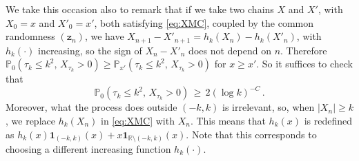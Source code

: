 \documentclass[reqno,11pt]{amsart}
\numberwithin{equation}{section}
\newcommand{\ind}{\mathbf{1}}
\newcommand{\bbP}{{\ensuremath{\mathbb P}} }
\newcommand{\bbR}{{\ensuremath{\mathbb R}} }
\newcommand{\logZ}{\mathtt{z}}
\begin{document}
We take this occasion also to remark that if we take two chains $X$ and $X'$, with $X_0=x$ and  $X'_0=x'$, both satisfying \eqref{eq:XMC}, coupled by the common randomness $( \logZ_n)$, we have
$X_{n+1}-X'_{n+1}= h_k(X_n)- h_k(X'_n)$, with $h_k(\cdot) $ increasing,  so the sign of $X_{n}-X'_{n}$ does not depend on $n$. 
Therefore 
$\bbP_0\left( \tau_k \le k^2, \, 
X_{\tau_k} >0\right)\ge \bbP_{x'}\left( \tau_k \le k^2, \, 
X_{\tau_k} >0\right)$  for $x \ge x'$. So it suffices  to check that 
\begin{equation} 
\label{eq:tbv}
\bbP_0\left( \tau_k \le k^2, \, 
X_{\tau_k} >0\right)\, \ge \,  2( \log k) ^{-C}\,.
\end{equation}
Moreover, what the process does outside $(-k, k)$ is irrelevant, so, when $\vert X_n\vert \ge k$, we replace $h_k(X_n)$ in 
\eqref{eq:XMC}  with $X_n$. This means that $h_k(x)$ is redefined as $h_k(x) \ind_{(-k,k)}(x)+ x\ind_{\bbR \setminus(-k,k)}(x)$.
Note that this corresponds to choosing a different increasing function $h_k(\cdot)$. 
\end{document}
